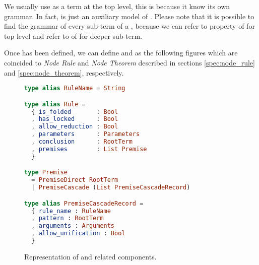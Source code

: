 \documentclass[master.tex]{subfiles}
\begin{document}
We usually use  as a term at the top level, this is because it
know its own grammar. In fact,  is just an auxiliary model of
. Please note that it is possible to find the grammar of every
sub-term of a , because we can refer to 
property of  for top level and refer to 
of  for deeper sub-term.

Once  has been defined, we can define  and
 as the following figures which are coincided to \emph{Node Rule}
and \emph{Node Theorem} described in sections \ref{spec:node_rule} and
\ref{spec:node_theorem}, respectively.

\begin{figure}[H]
\begin{framed}
\begin{lstlisting}[language=elm]
type alias RuleName = String

type alias Rule =
  { is_folded       : Bool
  , has_locked      : Bool
  , allow_reduction : Bool
  , parameters      : Parameters
  , conclusion      : RootTerm
  , premises        : List Premise
  }

type Premise
  = PremiseDirect RootTerm
  | PremiseCascade (List PremiseCascadeRecord)

type alias PremiseCascadeRecord =
  { rule_name : RuleName
  , pattern : RootTerm
  , arguments : Arguments
  , allow_unification : Bool
  }
\end{lstlisting}

\end{framed}
\caption{Representation of  and related components.}
\label{fig:implementation-repo-rule}
\end{figure}
\end{document}
